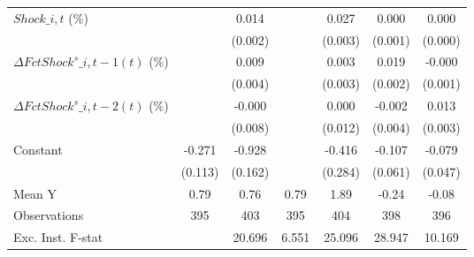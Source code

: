 {\begin{tabular}{l*{6}{c}}
\addlinespace
$ Shock\_{i,t}$ (\%) &                     &       0.014\sym{***}&                     &       0.027\sym{***}&       0.000         &       0.000         \\
                    &                     &     (0.002)         &                     &     (0.003)         &     (0.001)         &     (0.000)         \\
\addlinespace
$ \Delta FctShock^s\_{i,t-1}(t)$ (\%)&                     &       0.009\sym{**} &                     &       0.003         &       0.019\sym{***}&      -0.000         \\
                    &                     &     (0.004)         &                     &     (0.003)         &     (0.002)         &     (0.001)         \\
\addlinespace
$ \Delta FctShock^s\_{i,t-2}(t)$ (\%)&                     &      -0.000         &                     &       0.000         &      -0.002         &       0.013\sym{***}\\
                    &                     &     (0.008)         &                     &     (0.012)         &     (0.004)         &     (0.003)         \\
\addlinespace
Constant            &      -0.271\sym{**} &      -0.928\sym{***}&                     &      -0.416         &      -0.107\sym{*}  &      -0.079         \\
                    &     (0.113)         &     (0.162)         &                     &     (0.284)         &     (0.061)         &     (0.047)         \\
\midrule
Mean Y              &        0.79         &        0.76         &        0.79         &        1.89         &       -0.24         &       -0.08         \\
Observations        &         395         &         403         &         395         &         404         &         398         &         396         \\
Exc. Inst. F-stat   &                     &      20.696         &       6.551         &      25.096         &      28.947         &      10.169         \\
\bottomrule
\end{tabular}
}
